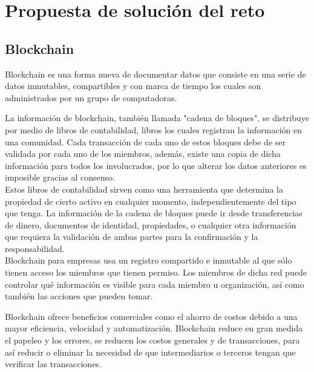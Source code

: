 \documentclass{article}
\begin{document}
    \section{Propuesta de solución del reto} \label{sec:introduction}



    \subsection{Blockchain}
     Blockchain es una forma nueva de documentar datos que consiste en una serie de datos inmutables, compartibles y con marca de tiempo los cuales son administrados por un grupo de computadoras.

    La información de blockchain, también llamada "cadena de bloques", se distribuye por medio de libros de contabilidad, libros los cuales registran la información en una comunidad. Cada transacción de cada uno de estos bloques debe de ser validada por cada uno de los miembros, además, existe una copia de dicha información para todos los involucrados, por lo que alterar los datos anteriores es imposible gracias al consenso. \cite{blockchain_education} \\

    Estos libros de contabilidad sirven como una herramienta que determina la propiedad de cierto activo en cualquier momento, independientemente del tipo que tenga. La información de la cadena de bloques puede ir desde transferencias de dinero, documentos de identidad, propiedades, o cualquier otra información que requiera la validación de ambas partes para la confirmación y la responsabilidad. \cite{blockchain_tec} \\

    Blockchain para empresas usa un registro compartido e inmutable al que sólo tienen acceso los miembros que tienen permiso. Los miembros de dicha red puede controlar qué información es visible para cada miembro u organización, así como también las acciones que pueden tomar.

    Blockchain ofrece beneficios comerciales como el ahorro de costos debido a una mayor eficiencia, velocidad y automatización. Blockchain reduce en gran medida el papeleo y los errores, se reducen los costos generales y de transacciones, para así reducir o eliminar la necesidad de que intermediarios o terceros tengan que verificar las transacciones.
\end{document}
